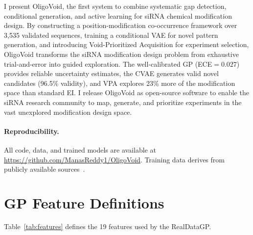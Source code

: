 \documentclass{article}
\begin{document}
I present OligoVoid, the first system to combine systematic gap detection, conditional generation, and active learning for siRNA chemical modification design. By constructing a position-modification co-occurrence framework over 3,535 validated sequences, training a conditional VAE for novel pattern generation, and introducing Void-Prioritized Acquisition for experiment selection, OligoVoid transforms the siRNA modification design problem from exhaustive trial-and-error into guided exploration. The well-calibrated GP (ECE$=0.027$) provides reliable uncertainty estimates, the CVAE generates valid novel candidates (96.5\% validity), and VPA explores 23\% more of the modification space than standard EI. I release OligoVoid as open-source software to enable the siRNA research community to map, generate, and prioritize experiments in the vast unexplored modification design space.

\paragraph{Reproducibility.} All code, data, and trained models are available at \url{https://github.com/ManasReddy1/OligoVoid}. Training data derives from publicly available sources~\citep{huesken2005, takahashi2009, dar2016}.






\appendix

\section{GP Feature Definitions}
\label{app:features}

Table~\ref{tab:features} defines the 19 features used by the RealDataGP.
\end{document}
